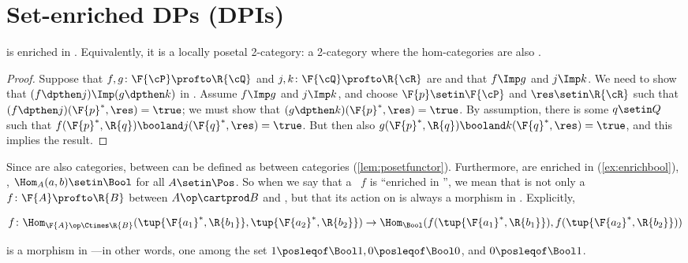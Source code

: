 
\section{Set-enriched DPs (DPIs)}

\begin{proposition}
    \label{prop:DP_loc_pos}
    \DP is enriched in \Pos.
    Equivalently, it is a locally posetal 2-category: a 2-category where the hom-categories are also .
\end{proposition}
\begin{proof}
    Suppose that $f,g\colon \F{\cP} \profto \R{\cQ}$ and $j,k\colon \F{\cQ} \profto \R{\cR}$ are  and that $f\Imp g$ and $j\Imp k$.
    We need to show that $(f\dpthen j)\Imp(g\dpthen k)$ in \DP.
    Assume $f\Imp g$ and $j\Imp k$, and choose $\F{p}\setin\F{\cP} $ and $\res\setin\R{\cR}$ such that $(f\dpthen j)(\F{p}^*,\res)=\true$; we must show that $(g \dpthen k)(\F{p}^*,\res)=\true$.
    By assumption, there is some $q\setin Q$ such that $f(\F{p}^*,\R{q})\booland j(\F{q}^*,\res)=\true$.
    But then also $g(\F{p}^*,\R{q})\booland k(\F{q}^*,\res)=\true$, and this implies the result.
\end{proof}
Since  are also categories,  between  can be defined as  between  categories (\cref{lem:posetfunctor}).
Furthermore,  are enriched in \Bool (\cref{ex:enrichbool}), \ie, $\Hom_A(a,b) \setin \Bool$ for all $A \setin \Pos$.
So when we say that a ~$f$ is ``enriched in \Bool'', we mean that is not only a  $f \colon \F{A} \profto \R{B}$ between  $A\op \cartprod B$ and \Bool, but that its action on  is always a morphism in \Bool.
Explicitly,

\begin{widepar}
    \begin{equation}
        f \colon \Hom_{\F{A}\op \Ctimes \R{B}}(\tup{\F{a_1}^*,\R{b_1}}, \tup{\F{a_2}^*,\R{b_2}}) \to \Hom_{\Bool}(f(\tup{\F{a_1}^*,\R{b_1}}), f(\tup{\F{a_2}^*,\R{b_2}}))
    \end{equation}
\end{widepar}
is a morphism in \Bool---in other words, one among the set $1 \posleqof\Bool 1, 0 \posleqof\Bool 0$, and $0 \posleqof\Bool 1$.

